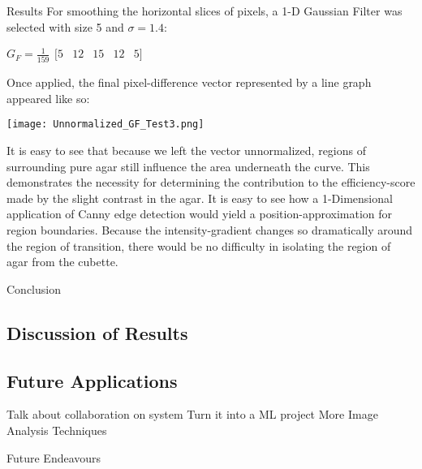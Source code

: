 \documentclass[a4paper,12pt]{article}
\begin{document}
\begin{section}{Results}
For smoothing the horizontal slices of pixels, a 1-D Gaussian Filter was selected with size 5 and $\sigma = 1.4$:

\begin{center}
$G_F = \frac{1}{159}
\begin{matrix}
[ 5 & 12 & 15 & 12 & 5 ]
\end{matrix}$
\end{center}
	
Once applied, the final pixel-difference vector represented by a line graph appeared like so:

\begin{center}
\texttt{[image: Unnormalized\_GF\_Test3.png]}
\end{center}

It is easy to see that because we left the vector unnormalized, regions of surrounding pure agar still influence the area underneath the curve. This demonstrates the necessity for determining the contribution to the efficiency-score made by the slight contrast in the agar. It is easy to see how a 1-Dimensional application of Canny edge detection would yield a position-approximation for region boundaries. Because the intensity-gradient changes so dramatically around the region of transition, there would be no difficulty in isolating the region of agar from the cubette.

\end{section}

\newpage
\begin{section}{Conclusion}
\subsection{Discussion of Results}

\subsection{Future Applications}

Talk about collaboration on system
	Turn it into a ML project
	More Image Analysis Techniques

Future Endeavours
\end{section}
\end{document}
